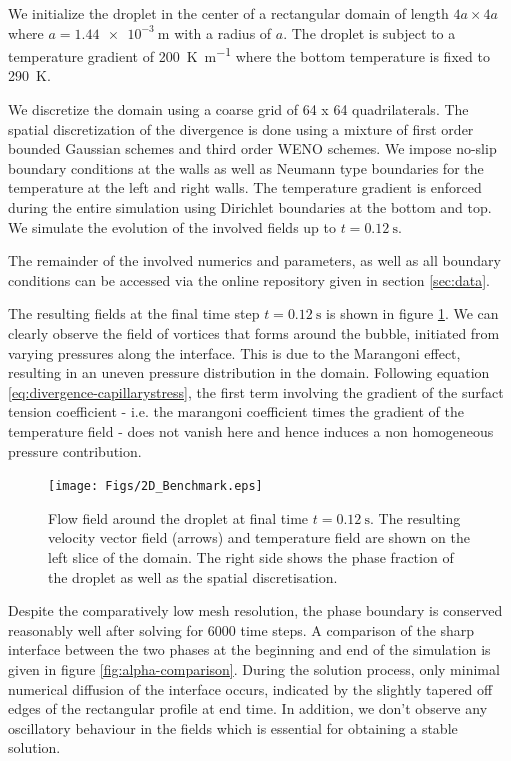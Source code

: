 \documentclass[conference,final]{IEEEtran}
\begin{document}
We initialize the droplet in the center of a rectangular domain of length $4a \times 4a$ where $a = \SI{1.44e-3}{\metre}$ with a radius of $a$. The droplet is subject to a temperature gradient of \SI{200}{\kelvin \per \metre} where the bottom temperature is fixed to \SI{290}{\kelvin}.

We discretize the domain using a coarse grid of 64 x 64 quadrilaterals. The spatial discretization of the divergence is done using a mixture of first order bounded Gaussian schemes and third order WENO schemes.
We impose no-slip boundary conditions at the walls as well as Neumann type boundaries for the temperature at the left and right walls. The temperature gradient is enforced during the entire simulation using Dirichlet boundaries at the bottom and top. We simulate the evolution of the involved fields up to $t = \SI{0.12}{\second}$.

The remainder of the involved numerics and parameters, as well as all boundary conditions can be accessed via the online repository given in section \ref{sec:data}.

The resulting fields at the final time step $t = \SI{0.12}{\second}$ is shown in figure \ref{fig:2d-benchmark}. We can clearly observe the field of vortices that forms around the bubble, initiated from varying pressures along the interface. This is due to the Marangoni effect, resulting in an uneven pressure distribution in the domain. Following equation \ref{eq:divergence-capillarystress}, the first term involving the gradient of the surfact tension coefficient - i.e. the marangoni coefficient times the gradient of the temperature field - does not vanish here and hence induces a non homogeneous pressure contribution.

\begin{figure}[!tbp]
  \centering
  \texttt{[image: Figs/2D\_Benchmark.eps]}
  \caption{Flow field around the droplet at final time $t = \SI{0.12}{\second}$. The resulting velocity vector field (arrows) and temperature field are shown on the left slice of the domain. The right side shows the phase fraction of the droplet as well as the spatial discretisation.}
  \label{fig:2d-benchmark}
\end{figure}

Despite the comparatively low mesh resolution, the phase boundary is conserved reasonably well after solving for 6000 time steps. A comparison of the sharp interface between the two phases at the beginning and end of the simulation is given in figure \ref{fig:alpha-comparison}. During the solution process, only minimal numerical diffusion of the interface occurs, indicated by the slightly tapered off edges of the rectangular profile at end time. In addition, we don't observe any oscillatory behaviour in the fields which is essential for obtaining a stable solution.
\end{document}
